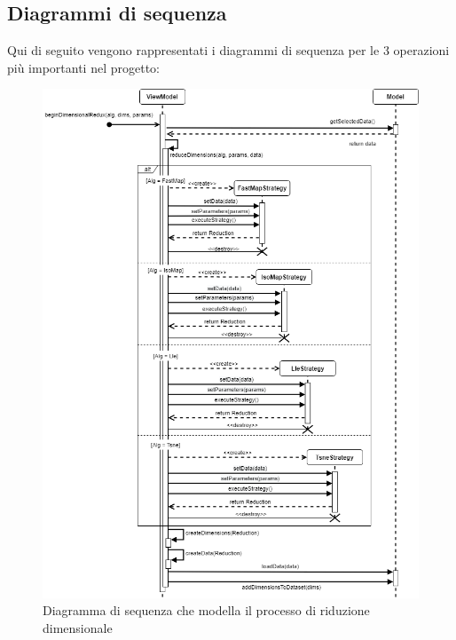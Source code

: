 \subsection{Diagrammi di sequenza}
Qui di seguito vengono rappresentati i diagrammi di sequenza per le 3 operazioni più importanti nel progetto:
\begin{figure}[hb]
\includegraphics[width=12cm]{Images/Allegato Tecnico-Sequenza-DR}
\centering
\caption{Diagramma di sequenza che modella il processo di riduzione dimensionale}
\end{figure}
\newpage
